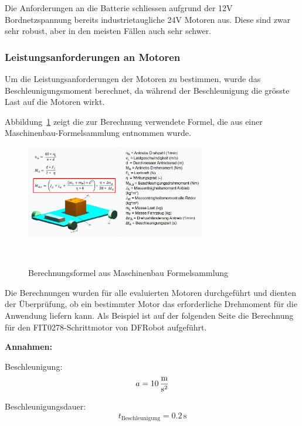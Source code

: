 \documentclass[main.  tex]{subfiles} %
\begin{document}
Die Anforderungen an die Batterie schliessen aufgrund der 12V Bordnetzspannung
bereits industrietaugliche 24V Motoren aus. Diese sind zwar sehr robust, aber
in den meisten Fällen auch sehr schwer.

\newpage

\subsubsection*{Leistungsanforderungen an Motoren}
Um die Leistungsanforderungen der Motoren zu bestimmen, wurde das Beschleunigungsmoment
berechnet, da während der Beschleunigung die grösste Last auf die Motoren wirkt.

Abbildung~\ref{fig:Formel_Beschleunigungsmoment} zeigt die zur Berechnung
verwendete Formel, die aus einer Maschinenbau-Formelsammlung entnommen wurde.

\begin{figure}[H]
    \centering
    \includegraphics[width=0.7\textwidth]{./fig_Antriebe/Formel_Beschleunigungsmoment.pdf}
    \caption{Berechnungsformel aus Maschinenbau Formelsammlung}~\label{fig:Formel_Beschleunigungsmoment}
\end{figure}

Die Berechnungen wurden für alle evaluierten Motoren durchgeführt und dienten
der Überprüfung, ob ein bestimmter Motor das erforderliche Drehmoment für die
Anwendung liefern kann. Als Beispiel ist auf der folgenden Seite die Berechnung
für den FIT0278-Schrittmotor von DFRobot aufgeführt.

\newpage

\textbf{Annahmen:}

\vspace{0.2cm}

Beschleunigung:
\[
    a = 10 \, \si{\frac{\meter}{\second\squared}}
\]

\vspace{0.2cm}

Beschleunigungsdauer:
\[
    t_{\text{Beschleunigung}} = 0.2 \, \si{\second}
\]
\end{document}
